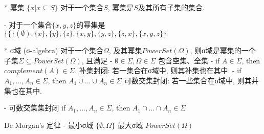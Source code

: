 * 幂集
	\Define
		$\{x | x \subseteq S\}$
		对于一个集合$S$, 幂集是$S$及其所有子集的集合.

	\Examle
		- 对于一个集合$\{x, y, z\}$的幂集是
			$\{
				\{\} (\emptyset), 
				\{x\},  \{y\},  \{z\}, 
				\{x, y\},  \{y, z\},  \{z, x\}, 
				\{x, y, z\}
			\}$

	* σ域 (σ-algebra)
		\Define
			对于一个集合$Ω$, 及其幂集$PowerSet(Ω)$, 则σ域是幂集的一个子集$Σ \subseteq PowerSet(Ω)$, 且满足
			- $\emptyset \in Σ, Ω \in Σ$
				包含空集、全集 
			- if $A \in Σ$, then $complement(A) \in Σ$.
				补集封闭: 若一集合在σ域中, 则其补集也在其中.
			- if $A_1, ... , A_n \in Σ$, then $A_1 \cup ... \cup A_n \in Σ$
				可数交集封闭: 若一些集合在σ域中, 则其并集也在其中.

		\Perporty
			- 可数交集集封闭
				if $A_1, ... , A_n \in Σ$, then $A_1 \cap ... \cap A_n \in Σ$

				\Proof
					De Morgan's 定律
			- 最小σ域 $\{\emptyset, Ω\}$
				最大σ域 $PowerSet(Ω)$